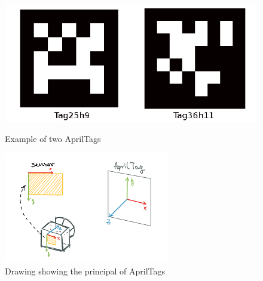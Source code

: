 \begin{figure}[H]
  \centering
  \begin{minipage}[b]{0.4\textwidth}
    \includegraphics[width=\textwidth]{Figures/images/apriltags.png}
    \caption{Example of two AprilTags}
    \label{fig:apriltags}
  \end{minipage}
  \hfill
  \begin{minipage}[b]{0.4\textwidth}
    \includegraphics[width=\textwidth]{Figures/images/apriltag_prinsipal.png}
    \caption{Drawing showing the principal of AprilTags}
    \label{fig:apriltag_principal}
  \end{minipage}
\end{figure}
